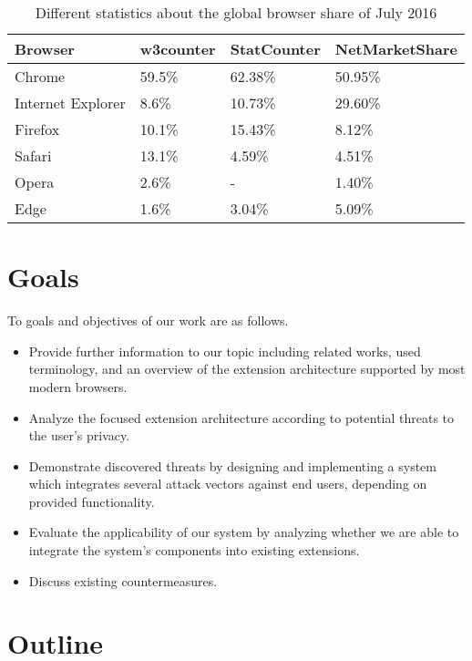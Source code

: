 	\begin{table}
		\centering
		\begin{tabular}{|l|l|l|l|}
			\hline
			\textbf{Browser} & \textbf{w3counter} & \textbf{StatCounter} & \textbf{NetMarketShare} \\ \hline
			Chrome & 59.5\% & 62.38\% & 50.95\% \\ \hline
			Internet Explorer & 8.6\% & 10.73\% & 29.60\% \\ \hline
			Firefox & 10.1\% & 15.43\% & 8.12\% \\ \hline
			Safari & 13.1\% & 4.59\% & 4.51\% \\  \hline
			Opera & 2.6\% & - & 1.40\% \\ \hline
			Edge & 1.6\% & 3.04\% & 5.09\% \\ \hline
		\end{tabular}
		\caption{Different statistics about the global browser share of July 2016 \cite{w3browserStats, statcounter, netmarketshare}}
		\label{tab:browserShare}
	\end{table}	
	
\section{Goals}
	
	To goals and objectives of our work are as follows.
	\begin{itemize}[nosep]
		\item Provide further information to our topic including related works, used terminology, and an overview of the extension architecture supported by most modern browsers.
		\item Analyze the focused extension architecture according to potential threats to the user's privacy.
		\item Demonstrate discovered threats by designing and implementing a system which integrates several attack vectors against end users, depending on provided functionality.
		\item Evaluate the applicability of our system by analyzing whether we are able to integrate the system's components into existing extensions. 
		\item Discuss existing countermeasures. 
	\end{itemize}

\section{Outline}
	
